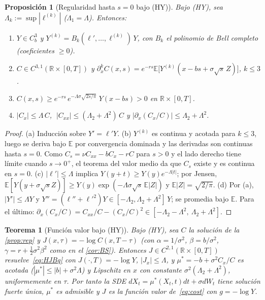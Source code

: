 \documentclass[11pt,letterpaper]{article}
\theoremstyle{plain}
\newtheorem{teorema}[theorem]{Teorema}
\newtheorem{proposicion}[theorem]{Proposición}
\theoremstyle{definition}
\theoremstyle{remark}
\numberwithin{equation}{section}
\newcommand{\R}{\mathbb{R}}
\newcommand{\E}{\mathbb{E}}
\begin{document}
	\begin{proposicion}[Regularidad hasta \(s=0\) bajo (HY)]\label{prop:reg0}
		Bajo (HY), sea \(\Lambda_k:=\sup|\ell^{(k)}|\) (\(\Lambda_1=\Lambda\)). Entonces:
		\begin{enumerate}[label=(\alph*)]
			\item \(Y\in C_b^3\) y \(Y^{(k)}=B_k(\ell',\dots,\ell^{(k)})\,Y\), con \(B_k\) el polinomio de Bell completo (coeficientes \(\ge0\)).
			\item \(C\in C^{3,1}(\R\times[0,T])\) y \(\partial_x^kC(x,s)=e^{-rs}\E\bigl[Y^{(k)}(x-bs+\sigma\sqrt s\,Z)\bigr]\), \(k\le3\).
			\item \(C(x,s)\ge e^{-rs}\,e^{-\Lambda\sigma\sqrt{2s/\pi}}\;Y(x-bs)>0\) en \(\R\times[0,T]\).
			\item \(|C_x|\le\Lambda\,C\), \(\;|C_{xx}|\le(\Lambda_2+\Lambda^2)\,C\) y \(\bigl|\partial_x(C_x/C)\bigr|\le\Lambda_2+\Lambda^2\).
		\end{enumerate}
	\end{proposicion}
	
	\begin{proof}
		(a) Inducción sobre \(Y'=\ell'Y\). (b) \(Y^{(k)}\) es continua y acotada para \(k\le3\), luego se deriva bajo \(\E\) por convergencia dominada y las derivadas son continuas hasta \(s=0\). Como \(C_s=\nu C_{xx}-bC_x-rC\) para \(s>0\) y el lado derecho tiene límite cuando \(s\to0^+\), el teorema del valor medio da que \(C_s\) existe y es continua en \(s=0\). (c) \(|\ell'|\le\Lambda\) implica \(Y(y+t)\ge Y(y)e^{-\Lambda|t|}\); por Jensen, \(\E[Y(y+\sigma\sqrt sZ)]\ge Y(y)\exp(-\Lambda\sigma\sqrt s\,\E|Z|)\) y \(\E|Z|=\sqrt{2/\pi}\). (d) Por (a), \(|Y'|\le\Lambda Y\) y \(Y''=(\ell''+\ell'^2)Y\in[-\Lambda_2,\Lambda_2+\Lambda^2]\,Y\); se promedia bajo \(\E\). Para el último: \(\partial_x(C_x/C)=C_{xx}/C-(C_x/C)^2\in[-\Lambda_2-\Lambda^2,\ \Lambda_2+\Lambda^2]\).
	\end{proof}
	
	\begin{teorema}[Función valor bajo (HY)]\label{teo:valor}
		Bajo (HY), sea \(C\) la solución de la \cref{prop:rep} y \(J(x,\tau)=-\log C(x,T-\tau)\) (con \(\alpha=1/\sigma^2\), \(\beta=b/\sigma^2\), \(\gamma=r+\frac12\sigma^2\beta^2\) como en el \cref{cor:BS}). Entonces \(J\in C^{2,1}(\R\times[0,T])\) resuelve~\eqref{eq:HJBq} con \(J(\cdot,T)=-\log Y\), \(|J_x|\le\Lambda\), y \(\mu^\ast=-b+\sigma^2C_x/C\) es acotada (\(|\mu^\ast|\le|b|+\sigma^2\Lambda\)) y Lipschitz en \(x\) con constante \(\sigma^2(\Lambda_2+\Lambda^2)\), uniformemente en \(\tau\). Por tanto la SDE \(dX_t=\mu^\ast(X_t,t)dt+\sigma dW_t\) tiene solución fuerte única, \(\mu^\ast\) es admisible y \(J\) es la función valor de~\eqref{eq:cost} con \(g=-\log Y\).
	\end{teorema}
	
\end{document}
